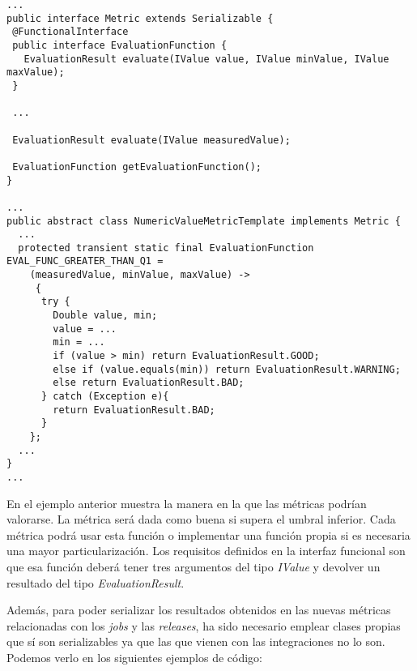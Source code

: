 \begin{minipage}{\linewidth}
{\tiny
\begin{verbatim}
...
public interface Metric extends Serializable {
 @FunctionalInterface
 public interface EvaluationFunction {
   EvaluationResult evaluate(IValue value, IValue minValue, IValue maxValue);
 }

 ...
 
 EvaluationResult evaluate(IValue measuredValue);

 EvaluationFunction getEvaluationFunction();
}

...
public abstract class NumericValueMetricTemplate implements Metric {
  ...
  protected transient static final EvaluationFunction EVAL_FUNC_GREATER_THAN_Q1 = 
    (measuredValue, minValue, maxValue) -> 
     {
      try {
        Double value, min;
	    value = ...
	    min = ...
	    if (value > min) return EvaluationResult.GOOD;
	    else if (value.equals(min)) return EvaluationResult.WARNING;
	    else return EvaluationResult.BAD;
	  } catch (Exception e){
	    return EvaluationResult.BAD;
	  }
    };
  ...
}
...
\end{verbatim}
}
\end{minipage}

En el ejemplo anterior muestra la manera en la que las métricas podrían valorarse. La métrica será dada como buena si supera el umbral inferior. Cada métrica podrá usar esta función o implementar una función propia si es necesaria una mayor particularización. Los requisitos definidos en la interfaz funcional son que esa función deberá tener tres argumentos del tipo \textit{IValue} y devolver un resultado del tipo \textit{EvaluationResult}.


Además, para poder serializar los resultados obtenidos en las nuevas métricas relacionadas con los \textit{jobs} y las \textit{releases}, ha sido necesario emplear clases propias que sí son serializables ya que las que vienen con las integraciones no lo son. Podemos verlo en los siguientes ejemplos de código:

